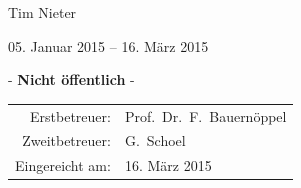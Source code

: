 \begin{titlepage}
\begin{large}
\begin{center}
			\begin{Large}
			Tim Nieter\\
			\end{Large}
			
			\vspace{.5cm}
			
			{05. Januar 2015} -- {16. März 2015}
			
			\vfill
			
			- \textbf{Nicht öffentlich} -
			
			\vfill
			
			\begin{tabular}{rl}
			 Erstbetreuer:   & Prof.\ Dr.\ F.\ Bauernöppel\\
			 Zweitbetreuer:   & G.\ Schoel\\
			 Eingereicht am:   & {16. März 2015}
			\end{tabular}
		\end{center}
	\end{large}
\end{titlepage}


%